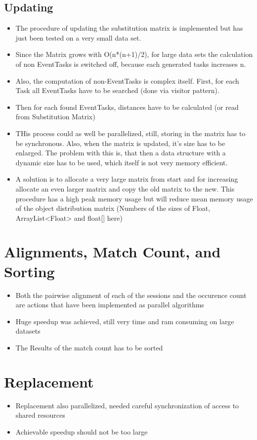 \subsection{Updating}
\begin{itemize}
	\item The procedure of updating the substitution matrix is implemented but has just been tested on a very small data set. 
	\item Since the Matrix grows with O(n*(n+1)/2), for large data sets the calculation of non EventTasks is switched off, because each generated tasks increases n.
	\item Also, the computation of non-EventTasks is complex itself. First, for each Task all EventTasks have to be searched (done via visitor pattern). 
	\item Then for each found EventTasks, distances have to be calculated (or read from Substitution Matrix)
	\item THis process could as well be parallelized, still, storing in the matrix has to be synchronous. Also, when the matrix is updated, it's size has to be enlarged. The problem with this is, that then a data structure with a dynamic size has to be used, which itself is not very memory efficient. 
	\item A solution is to allocate a very large matrix from start and for increasing allocate an even larger matrix and copy the old matrix to the new. This procedure has a high peak memory usage but will reduce mean memory usage of the object distribution matrix (Numbers of the sizes of Float, ArrayList<Float> and float[] here)
\end{itemize}

\section{Alignments, Match Count, and Sorting}
\begin{itemize}
	\item Both the pairwise alignment of each of the sessions and the occurence count are actions that have been implemented as parallel algorithms
	\item Huge speedup was achieved, still very time and ram consuming on large datasets
	\item The Results of the match count has to be sorted
\end{itemize}

\section{Replacement}
\begin{itemize}
	\item Replacement also parallelized, needed careful synchronization of access to shared resources
	\item Achievable speedup should not be too large
\end{itemize}

